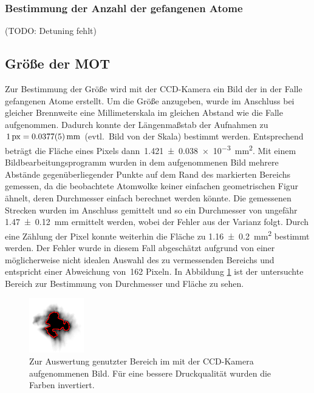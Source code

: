 \documentclass[11pt, a4paper]{article}
\numberwithin{equation}{section}
\newcommand{\korr}[1]{{\color{red}(#1)}}
\begin{document}
\subsubsection{Bestimmung der Anzahl der gefangenen Atome}
\korr{TODO: Detuning fehlt}



\subsection{Größe der MOT}
Zur Bestimmung der Größe wird mit der CCD-Kamera ein Bild der in der Falle gefangenen Atome erstellt.
Um die Größe anzugeben, wurde im Anschluss bei gleicher Brennweite eine Millimeterskala im gleichen Abstand wie die Falle aufgenommen.
Dadurch konnte der Längenmaßstab der Aufnahmen zu~$\SI{1}{px}=\SI{0,0377+-0,0005}{mm}$ \korr{evtl.\ Bild von der Skala} bestimmt werden.
Entsprechend beträgt die Fläche eines Pixels dann~\SI{1.421+-0.038e-3}{mm^2}.
Mit einem Bildbearbeitungsprogramm wurden in dem aufgenommenen Bild mehrere Abstände gegenüberliegender Punkte auf dem Rand des markierten Bereichs gemessen, da die beobachtete Atomwolke keiner einfachen geometrischen Figur ähnelt, deren Durchmesser einfach berechnet werden könnte.
Die gemessenen Strecken wurden im Anschluss gemittelt und so ein Durchmesser von ungefähr \SI{1,47+-0,12}{mm} ermittelt werden, wobei der Fehler aus der Varianz folgt.
Durch eine Zählung der Pixel konnte weiterhin die Fläche zu \SI{1,16+-0,2}{mm^2} bestimmt werden.
Der Fehler wurde in diesem Fall abgeschätzt aufgrund von einer möglicherweise nicht idealen Auswahl des zu vermessenden Bereichs und entspricht einer Abweichung von~\num{162} Pixeln.
In Abbildung \ref{fig:mot_groesse} ist der untersuchte Bereich zur Bestimmung von Durchmesser und Fläche zu sehen.
\begin{figure}[h]
	\centering
	\includegraphics[width=.7\textwidth]{./figures/size_inverted.png}
	\caption{Zur Auswertung genutzter Bereich im mit der CCD-Kamera aufgenommenen Bild. Für eine bessere Druckqualität wurden die Farben invertiert.}
	\label{fig:mot_groesse}
\end{figure}
\end{document}
